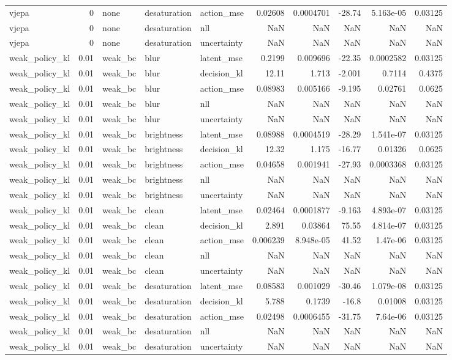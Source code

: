 \begin{tabular}{lrlllrrrrr}
vjepa & 0 & none & desaturation & action\_mse & 0.02608 & 0.0004701 & -28.74 & 5.163e-05 & 0.03125 \\
vjepa & 0 & none & desaturation & nll & NaN & NaN & NaN & NaN & NaN \\
vjepa & 0 & none & desaturation & uncertainty & NaN & NaN & NaN & NaN & NaN \\
weak\_policy\_kl & 0.01 & weak\_bc & blur & latent\_mse & 0.2199 & 0.009696 & -22.35 & 0.0002582 & 0.03125 \\
weak\_policy\_kl & 0.01 & weak\_bc & blur & decision\_kl & 12.11 & 1.713 & -2.001 & 0.7114 & 0.4375 \\
weak\_policy\_kl & 0.01 & weak\_bc & blur & action\_mse & 0.08983 & 0.005166 & -9.195 & 0.02761 & 0.0625 \\
weak\_policy\_kl & 0.01 & weak\_bc & blur & nll & NaN & NaN & NaN & NaN & NaN \\
weak\_policy\_kl & 0.01 & weak\_bc & blur & uncertainty & NaN & NaN & NaN & NaN & NaN \\
weak\_policy\_kl & 0.01 & weak\_bc & brightness & latent\_mse & 0.08988 & 0.0004519 & -28.29 & 1.541e-07 & 0.03125 \\
weak\_policy\_kl & 0.01 & weak\_bc & brightness & decision\_kl & 12.32 & 1.175 & -16.77 & 0.01326 & 0.0625 \\
weak\_policy\_kl & 0.01 & weak\_bc & brightness & action\_mse & 0.04658 & 0.001941 & -27.93 & 0.0003368 & 0.03125 \\
weak\_policy\_kl & 0.01 & weak\_bc & brightness & nll & NaN & NaN & NaN & NaN & NaN \\
weak\_policy\_kl & 0.01 & weak\_bc & brightness & uncertainty & NaN & NaN & NaN & NaN & NaN \\
weak\_policy\_kl & 0.01 & weak\_bc & clean & latent\_mse & 0.02464 & 0.0001877 & -9.163 & 4.893e-07 & 0.03125 \\
weak\_policy\_kl & 0.01 & weak\_bc & clean & decision\_kl & 2.891 & 0.03864 & 75.55 & 4.814e-07 & 0.03125 \\
weak\_policy\_kl & 0.01 & weak\_bc & clean & action\_mse & 0.006239 & 8.948e-05 & 41.52 & 1.47e-06 & 0.03125 \\
weak\_policy\_kl & 0.01 & weak\_bc & clean & nll & NaN & NaN & NaN & NaN & NaN \\
weak\_policy\_kl & 0.01 & weak\_bc & clean & uncertainty & NaN & NaN & NaN & NaN & NaN \\
weak\_policy\_kl & 0.01 & weak\_bc & desaturation & latent\_mse & 0.08583 & 0.001029 & -30.46 & 1.079e-08 & 0.03125 \\
weak\_policy\_kl & 0.01 & weak\_bc & desaturation & decision\_kl & 5.788 & 0.1739 & -16.8 & 0.01008 & 0.03125 \\
weak\_policy\_kl & 0.01 & weak\_bc & desaturation & action\_mse & 0.02498 & 0.0006455 & -31.75 & 7.64e-06 & 0.03125 \\
weak\_policy\_kl & 0.01 & weak\_bc & desaturation & nll & NaN & NaN & NaN & NaN & NaN \\
weak\_policy\_kl & 0.01 & weak\_bc & desaturation & uncertainty & NaN & NaN & NaN & NaN & NaN \\
\bottomrule
\end{tabular}
